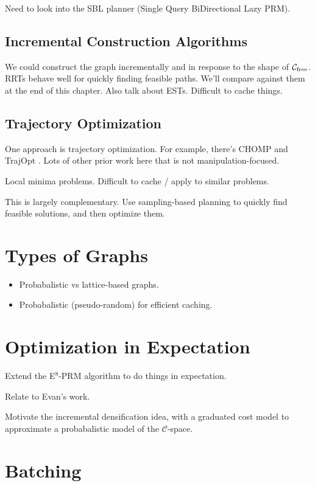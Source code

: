 Need to look into the SBL planner \cite{sanchezante2001sbl}
(Single Query BiDirectional Lazy PRM).

\subsection{Incremental Construction Algorithms}

We could construct the graph incrementally and in response to the shape
of $\mathcal{C}_{\mbox{\scriptsize free}}$.
RRTs behave well for quickly finding feasible paths.
We'll compare against them at the end of this chapter.
Also talk about ESTs.
Difficult to cache things.

\subsection{Trajectory Optimization}

One approach is trajectory optimization.
For example, there's CHOMP \cite{zucker2013chomp}
and TrajOpt \cite{schulman2013trajopt}.
Lots of other prior work here that is not manipulation-focused.

Local minima problems.
Difficult to cache / apply to similar problems.

This is largely complementary.
Use sampling-based planning to quickly find feasible solutions,
and then optimize them.

\section{Types of Graphs}

\begin{itemize}
\item Probabalistic vs lattice-based graphs.
\item Probabalistic (pseudo-random) for efficient caching.
\end{itemize}

\section{Optimization in Expectation}

Extend the E$^8$-PRM algorithm to do things in expectation.

Relate to Evan's work.

Motivate the incremental densification idea,
with a graduated cost model
to approximate a probabalistic model
of the $\mathcal{C}$-space.

\section{Batching}

